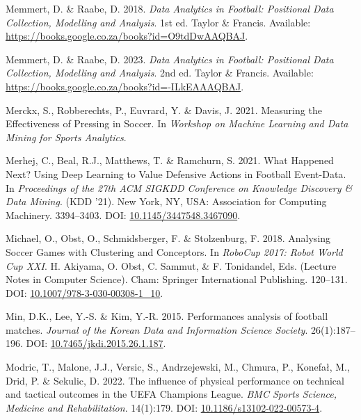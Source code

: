 \documentclass[
  a4paper,
  twoside]{uoe-thesis-template}
\newlength{\cslhangindent}
\newenvironment{CSLReferences}[2] %
 {\begin{list}{}{%
  \setlength{\itemindent}{0pt}
  \setlength{\leftmargin}{0pt}
  \setlength{\parsep}{0pt}
  \ifodd #1
   \setlength{\leftmargin}{\cslhangindent}
   \setlength{\itemindent}{-1\cslhangindent}
  \fi
  \setlength{\itemsep}{#2\baselineskip}}}
 {\end{list}}
\begin{document}
\begin{CSLReferences}{0}{0}
Memmert, D. \& Raabe, D. 2018. \emph{Data {Analytics} in {Football}:
{Positional} {Data} {Collection}, {Modelling} and {Analysis}}. 1st ed.
Taylor \& Francis. Available:
\url{https://books.google.co.za/books?id=O9tdDwAAQBAJ}.

Memmert, D. \& Raabe, D. 2023. \emph{Data {Analytics} in {Football}:
{Positional} {Data} {Collection}, {Modelling} and {Analysis}}. 2nd ed.
Taylor \& Francis. Available:
\url{https://books.google.co.za/books?id=-ILkEAAAQBAJ}.

Merckx, S., Robberechts, P., Euvrard, Y. \& Davis, J. 2021. Measuring
the {Effectiveness} of {Pressing} in {Soccer}. In \emph{Workshop on
{Machine} {Learning} and {Data} {Mining} for {Sports} {Analytics}}.

Merhej, C., Beal, R.J., Matthews, T. \& Ramchurn, S. 2021. What
{Happened} {Next}? {Using} {Deep} {Learning} to {Value} {Defensive}
{Actions} in {Football} {Event}-{Data}. In \emph{Proceedings of the 27th
{ACM} {SIGKDD} {Conference} on {Knowledge} {Discovery} \& {Data}
{Mining}}. ({KDD} '21). New York, NY, USA: Association for Computing
Machinery. 3394--3403. DOI:
\href{https://doi.org/10.1145/3447548.3467090}{10.1145/3447548.3467090}.

Michael, O., Obst, O., Schmidsberger, F. \& Stolzenburg, F. 2018.
Analysing {Soccer} {Games} with {Clustering} and {Conceptors}. In
\emph{{RoboCup} 2017: {Robot} {World} {Cup} {XXI}}. H. Akiyama, O. Obst,
C. Sammut, \& F. Tonidandel, Eds. (Lecture {Notes} in {Computer}
{Science}). Cham: Springer International Publishing. 120--131. DOI:
\href{https://doi.org/10.1007/978-3-030-00308-1_10}{10.1007/978-3-030-00308-1\_10}.

Min, D.K., Lee, Y.-S. \& Kim, Y.-R. 2015. Performances analysis of
football matches. \emph{Journal of the Korean Data and Information
Science Society}. 26(1):187--196. DOI:
\href{https://doi.org/10.7465/jkdi.2015.26.1.187}{10.7465/jkdi.2015.26.1.187}.

Modric, T., Malone, J.J., Versic, S., Andrzejewski, M., Chmura, P.,
Konefał, M., Drid, P. \& Sekulic, D. 2022. The influence of physical
performance on technical and tactical outcomes in the {UEFA} {Champions}
{League}. \emph{BMC Sports Science, Medicine and Rehabilitation}.
14(1):179. DOI:
\href{https://doi.org/10.1186/s13102-022-00573-4}{10.1186/s13102-022-00573-4}.


\end{CSLReferences}
\end{document}
